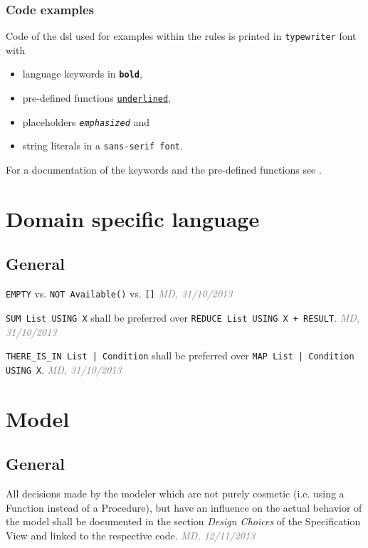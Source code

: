 \documentclass[draft, a4paper, oneside]{scrreprt}
\let\emph\textsl
\newcommand{\literally}[1]{\textsf{\emph{#1}}}
\newcommand{\code}[1]{\lstinline$#1$}
\newcommand{\ruleauthor}[2]{\mbox{}\newline\mbox{}\hfill{\footnotesize\textcolor{gray}{\emph{#1, #2}}}\xspace}}
\newcommand{\ruleauthor}[2]{}
\begin{document}
\subsection*{Code examples}
Code of the \gls{dsl} used for examples within the rules is printed in \texttt{typewriter} font with 
\begin{itemize}
\item language keywords in \texttt{\textbf{bold}},
\item pre-defined functions \texttt{\underline{underlined}},
\item placeholders \texttt{\emph{emphasized}} and
\item string literals in a \texttt{\textsf{sans-serif font}}.
\end{itemize}

For a documentation of the keywords and the pre-defined functions see \cite{efstechdesign}.



\chapter{Domain specific language}

\section{General}
\begin{rules}
\item {} \code{EMPTY} vs. \code{NOT Available()} vs. \code{[]} \ruleauthor{MD}{31/10/2013}
\item \code{SUM List USING X} shall be preferred over \code{REDUCE List USING X + RESULT}. \ruleauthor{MD}{31/10/2013}
\item \code{THERE_IS_IN List | Condition} shall be preferred over \code{MAP List | Condition USING X}. \ruleauthor{MD}{31/10/2013}
\end{rules}


\chapter{Model}

\section{General}

\begin{rules}
\item \label{rule:model_general_design_choices} All decisions made by the modeler which are not purely cosmetic (i.e. using a Function instead of a Procedure), but have an influence on the actual behavior of the model shall be documented in the section \literally{Design Choices} of the Specification View and linked to the respective code. \ruleauthor{MD}{12/11/2013}

\end{rules}
\end{document}
